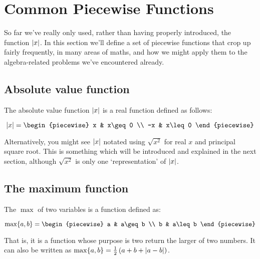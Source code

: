 \section{Common Piecewise Functions}

So far we've really only used, rather than having properly introduced, the function $\abs{x}$. In this section we'll define a set of piecewise functions that crop up fairly frequently, in many areas of maths, and how we might apply them to the algebra-related problems we've encountered already.

\subsection{Absolute value function}
The absolute value function $\abs{x}$ is a real function defined as follows:

$$
    \abs{x}=\begin{piecewise}
        x & x\geq 0 \\
        -x & x\leq 0
    \end{piecewise}
$$

Alternatively, you might see $\abs{x}$ notated using $\sqrt{x^2}$ for real $x$ and principal square root. This is something which will be introduced and explained in the next section, although $\sqrt{x^2}$ is only one `representation' of $\abs{x}$.

\subsection{The maximum function}
The $\max$ of two variables is a function defined as:

$$
    \max\br{a,b}=\begin{piecewise}
        a & a\geq b \\
        b & a\leq b
    \end{piecewise}
$$

That is, it is a function whose purpose is two return the larger of two numbers. It can also be written as $\max\{a,b\}=\frac{1}{2}\left(a+b+\abs{a-b}\right)$.

